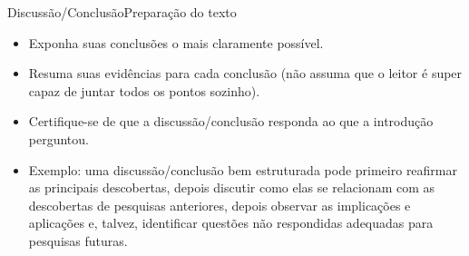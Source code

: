 \documentclass[t]{beamer}
\begin{document}
\begin{ftst}{Discussão/Conclusão}{Preparação do texto}
\justifying
\begin{itemize}
    \item Exponha suas conclusões o mais claramente possível.
    \vone
    \item Resuma suas evidências para cada conclusão  (não assuma que o leitor é super capaz de juntar todos os pontos sozinho).
    \vone
    \item Certifique-se de que a discussão/conclusão responda ao que a introdução perguntou.
    \vone
    \item Exemplo: uma discussão/conclusão bem estruturada pode primeiro reafirmar as principais descobertas, depois discutir como elas se relacionam com as descobertas de pesquisas anteriores, depois observar as implicações e aplicações e, talvez, identificar questões não respondidas adequadas para pesquisas futuras.
\end{itemize}

\end{ftst}
\end{document}
